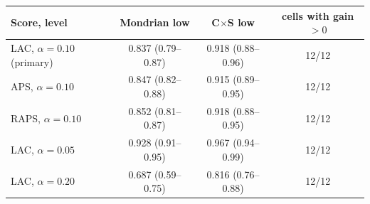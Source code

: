 \begin{tabular}{lccc}
\toprule
Score, level & Mondrian low & C$\times$S low & cells with gain $>0$\\
\midrule
LAC, $\alpha=0.10$ (primary) & 0.837 (0.79--0.87) & 0.918 (0.88--0.96) & 12/12\\
APS, $\alpha=0.10$ & 0.847 (0.82--0.88) & 0.915 (0.89--0.95) & 12/12\\
RAPS, $\alpha=0.10$ & 0.852 (0.81--0.87) & 0.918 (0.88--0.95) & 12/12\\
LAC, $\alpha=0.05$ & 0.928 (0.91--0.95) & 0.967 (0.94--0.99) & 12/12\\
LAC, $\alpha=0.20$ & 0.687 (0.59--0.75) & 0.816 (0.76--0.88) & 12/12\\
\bottomrule
\end{tabular}
